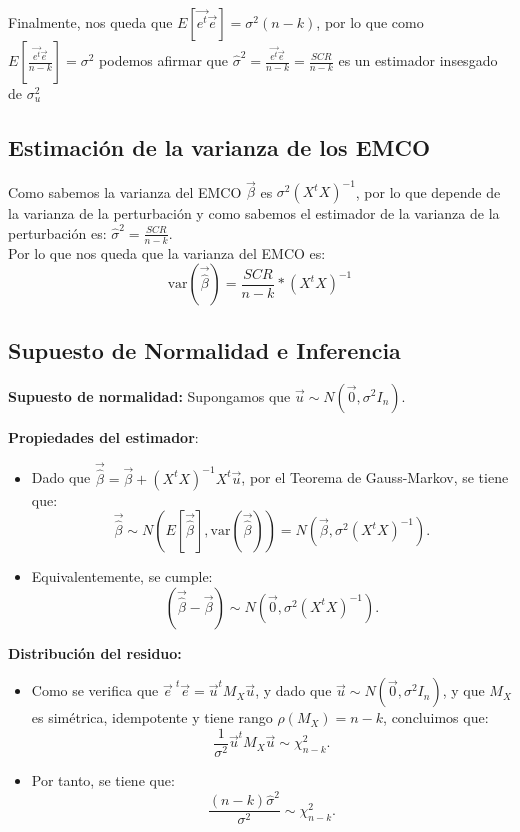 \documentclass[a4paper,12pt]{article}
\newcommand{\ecuacion}[1]{\ensuremath{#1}}
\begin{document}
Finalmente, nos queda que \ecuacion{E[\vec{e^t}\vec{e}] = \sigma^2(n-k)}, por lo que como \ecuacion{E[\frac{\vec{e^t}\vec{e}}{n - k}] = \sigma^2} podemos afirmar que \ecuacion{\hat{\sigma}^2 = \frac{\vec{e^t}\vec{e}}{n - k} = \frac{SCR}{n-k}} es un estimador insesgado de \ecuacion{\sigma_u^2}


\subsection{Estimación de la varianza de los EMCO}

Como sabemos la varianza del EMCO \ecuacion{\vec{\beta}} es \ecuacion{\sigma^2(X^tX)^{-1}}, por lo que depende de la varianza de la perturbación y como sabemos el estimador de la varianza de la perturbación es: \ecuacion{\hat{\sigma}^2 = \frac{SCR}{n-k}}.\\

Por lo que nos queda que la varianza del EMCO es:
\begin{equation}
    \text{var}(\vec{\hat{\beta}}) = \frac{SCR}{n-k} * (X^tX)^{-1}
\end{equation}

\subsection{Supuesto de Normalidad e Inferencia}

\textbf{Supuesto de normalidad:} Supongamos que \( \vec{u} \sim N(\vec{0}, \sigma^2 I_n) \).

\textbf{Propiedades del estimador}: 
\begin{itemize}
    \item Dado que \( \vec{\hat{\beta}} = \vec{\beta} + (X^t X)^{-1} X^t \vec{u} \), por el Teorema de Gauss-Markov, se tiene que:
    \[ \vec{\hat{\beta}} \sim N(E[\vec{\hat{\beta}}], \text{var}(\vec{\hat{\beta}})) = N(\vec{\beta}, \sigma^2 (X^t X)^{-1}). \]

    \item Equivalentemente, se cumple:
    \[ (\vec{\hat{\beta}} - \vec{\beta}) \sim N(\vec{0}, \sigma^2 (X^t X)^{-1}). \]

\end{itemize}

\textbf{Distribución del residuo:}
\begin{itemize}
    \item Como se verifica que \( \vec{e}^{\,\,t} \vec{e} = \vec{u}^t M_X \vec{u} \), y dado que \( \vec{u} \sim N(\vec{0}, \sigma^2 I_n) \), y que \( M_X \) es simétrica, idempotente y tiene rango \( \rho(M_X) = n - k \), concluimos que:
    \[ \frac{1}{\sigma^2} \vec{u}^t M_X \vec{u} \sim \chi^2_{n-k}. \]

    \item Por tanto, se tiene que:
    \[ \frac{(n-k) \hat{\sigma}^2}{\sigma^2} \sim \chi^2_{n-k}. \]
\end{itemize}
\end{document}
